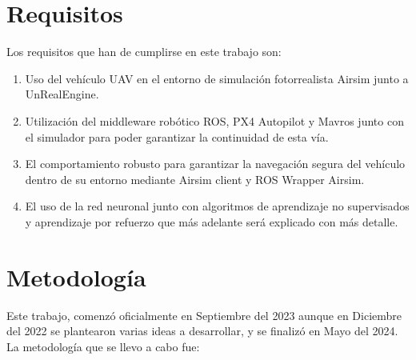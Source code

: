 \section{Requisitos}
\label{sec:requisitos}

Los requisitos que han de cumplirse en este trabajo son: 
\begin{enumerate}
    \item Uso del vehículo UAV en el entorno de simulación fotorrealista Airsim junto a UnRealEngine.
    \item Utilización del middleware robótico ROS, PX4 Autopilot y Mavros junto con el simulador para poder garantizar la continuidad de esta vía. 
    \item El comportamiento robusto para garantizar la navegación segura del vehículo dentro de su entorno mediante Airsim client y ROS Wrapper Airsim. 
    \item El uso de la red neuronal junto con algoritmos de aprendizaje no supervisados y aprendizaje por refuerzo que más adelante será explicado con más detalle.
\end{enumerate}


\section{Metodología}
\label{sec:metodologia}

Este trabajo, comenzó oficialmente en Septiembre del 2023 aunque en Diciembre del 2022 se plantearon varias ideas a desarrollar, y se finalizó en Mayo del 2024. \\

La metodología que se llevo a cabo fue:

